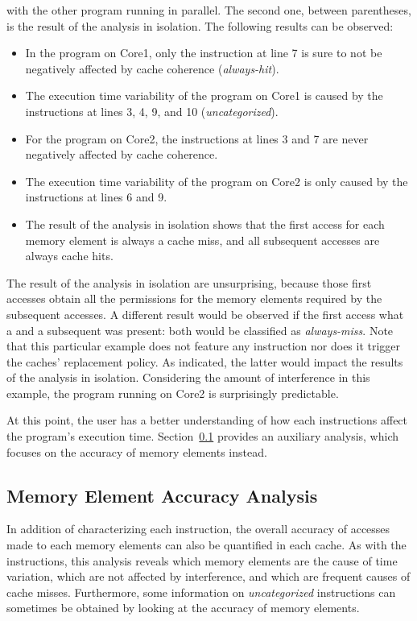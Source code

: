 \begin{example}
with the other program running in parallel. The second one, between
parentheses, is the result of the analysis in isolation. The following results
can be observed:
\begin{itemize}
\item
   In the program on Core1, only the instruction at line 7 is
   sure to not be negatively affected by cache coherence (\textit{always-hit}).
\item
   The execution time variability of the program on Core1 is caused by the
   instructions at lines 3, 4, 9, and 10 (\textit{uncategorized}).
\item
   For the program on Core2, the instructions at lines 3 and 7 are never
   negatively affected by cache coherence.
\item
   The execution time variability of the program on Core2 is only caused by the
   instructions at lines 6 and 9.
\item
   The result of the analysis in isolation shows that the first access for each
   memory element is always a cache miss, and all subsequent accesses are always
   cache hits.
\end{itemize}
The result of the analysis in isolation are unsurprising, because those first
accesses obtain all the permissions for the memory elements required by the
subsequent accesses. A different result would be observed if the first access
what a \loadinstr{} and a subsequent \storeinstr{} was present: both would be
classified as \textit{always-miss}. Note that this particular example does not
feature any \evictinstr{} instruction nor does it trigger the caches'
replacement policy. As indicated, the latter would impact the results of the
analysis in isolation. Considering the amount of interference in this example,
the program running on Core2 is surprisingly predictable.
\end{example}

At this point, the user has a better understanding of how each instructions
affect the program's execution time.
Section~\ref{sec:analysis:mem_elem_accuracy} provides an auxiliary analysis,
which focuses on the accuracy of memory elements instead.

\subsection{Memory Element Accuracy Analysis}
\label{sec:analysis:mem_elem_accuracy}
In addition of characterizing each instruction, the overall accuracy of accesses
made to each memory elements can also be quantified in each cache. As with the
instructions, this analysis reveals which memory elements are the cause of time
variation, which are not affected by interference, and which are frequent
causes of cache misses. Furthermore, some information on \textit{uncategorized}
instructions can sometimes be obtained by looking at the accuracy of memory
elements.

